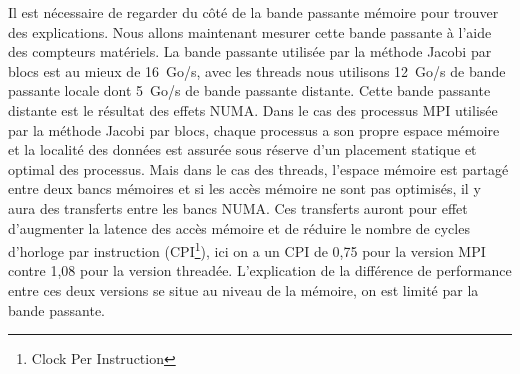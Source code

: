 Il est nécessaire de regarder du côté de la bande passante mémoire pour trouver des explications.
%
Nous allons maintenant mesurer cette bande passante à l'aide des compteurs matériels.
%
La bande passante utilisée par la méthode Jacobi par blocs est au mieux de 16~Go/s, avec les threads nous utilisons 12~Go/s de bande passante locale dont 5~Go/s de bande passante distante.
%
Cette bande passante distante est le résultat des effets NUMA.
%
Dans le cas des processus MPI utilisée par la méthode Jacobi par blocs, chaque processus a son propre espace mémoire et la localité des données est assurée sous réserve d'un placement statique et optimal des processus.
%
Mais dans le cas des threads, l'espace mémoire est partagé entre deux bancs mémoires et si les accès mémoire ne sont pas optimisés, il y aura des transferts entre les bancs NUMA.
%
Ces transferts auront pour effet d'augmenter la latence des accès mémoire et de réduire le nombre de cycles d'horloge par instruction (CPI\footnote{Clock Per Instruction}), ici on a un CPI de 0,75 pour la version MPI contre 1,08 pour la version threadée.
%
L'explication de la différence de performance entre ces deux versions se situe au niveau de la mémoire, on est limité par la bande passante.

